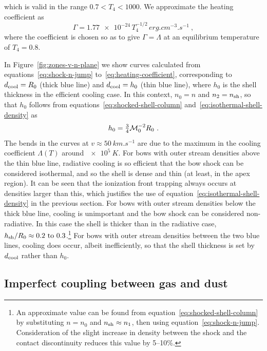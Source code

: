which is valid in the range \(0.7 < T_4 < 1000\).  We approximate the heating coefficient as
\begin{equation}
  \label{eq:heating-coefficient}
  \Gamma = \num{1.77e-24} \, T_4^{-1/2} \, \si{erg.cm^{-3}.s^{-1}} \ ,
\end{equation}
where the coefficient is chosen so as to give \(\Gamma = \Lambda\) at
an equilibrium temperature of \(T_4 = 0.8\).

In Figure~\ref{fig:zones-v-n-plane} we show curves calculated from
equations~\eqref{eq:shock-n-jump} to~\eqref{eq:heating-coefficient},
corresponding to \(d_{\text{cool}} = R_0\) (thick blue line) and
\(d_{\text{cool}} = h_0\) (thin blue line), where \(h_0\) is the shell
thickness in the efficient cooling case.  In this context, \(n_0 = n\)
and \(n_2 = n_{\text{sh}}\), so that \(h_0\) follows from
equations~\eqref{eq:shocked-shell-column}
and~\eqref{eq:isothermal-shell-density} as
\begin{equation}
  \label{eq:strong-cooling-h0}
  h_0 = \tfrac34 \mathcal{M}_0^{-2} R_0 \ .
\end{equation}
The bends in the curves at \(v \approx \SI{50}{km.s^{-1}}\) are due to the
maximum in the cooling coefficient \(\Lambda(T)\) around
\(\SI{e5}{K}\).  For bows with outer stream densities above the thin
blue line, radiative cooling is so efficient that the bow shock can be
considered isothermal, and so the shell is dense and thin (at least,
in the apex region).  It can be seen that the ionization front
trapping always occurs at densities larger than this, which justifies
the use of equation~\eqref{eq:isothermal-shell-density} in the
previous section.  For bows with outer stream densities below the
thick blue line, cooling is unimportant and the bow shock can be
considered non-radiative.  In this case the shell is thicker than in
the radiative case,
\(h\shell/R_0 \approx \text{\numrange{0.2}{0.3}}\).\footnote{%
  An approximate value can be found from
  equation~\eqref{eq:shocked-shell-column} by substituting \(n = n_0\)
  and \(n_{\text{sh}} \approx n_1\), then using equation~\eqref{eq:shock-n-jump}.
  Consideration of the slight increase in density between the shock
  and the contact discontinuity reduces this value by 5--10\%.} %
For bows with outer stream densities between the two blue lines,
cooling does occur, albeit inefficiently, so that the shell thickness
is set by \(d_{\text{cool}}\) rather than \(h_0\).

\subsection{Imperfect coupling between gas and dust}
\label{sec:imperf-coupl-betw}

